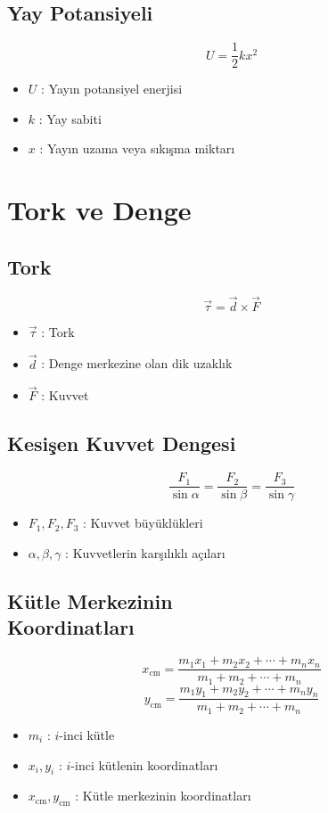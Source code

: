 \documentclass[a4paper, 11pt, titlepage]{article}
\begin{document}
\subsection{Yay Potansiyeli}
\[
U = \frac{1}{2} k x^2
\]
\begin{itemize}
  \item $U$ : Yayın potansiyel enerjisi
  \item $k$ : Yay sabiti
  \item $x$ : Yayın uzama veya sıkışma miktarı
\end{itemize}

\section{Tork ve Denge}



\subsection{Tork}
\[
\vec{\tau} = \vec{d} \times \vec{F}
\]
\begin{itemize}
  \item $\vec{\tau}$ : Tork
  \item $\vec{d}$ : Denge merkezine olan dik uzaklık
  \item $\vec{F}$ : Kuvvet
\end{itemize}

\subsection{Kesişen Kuvvet Dengesi}
\[
\frac{F_1}{\sin \alpha} = \frac{F_2}{\sin \beta} = \frac{F_3}{\sin \gamma}
\]
\begin{itemize}
  \item $F_1, F_2, F_3$ : Kuvvet büyüklükleri
  \item $\alpha, \beta, \gamma$ : Kuvvetlerin karşılıklı açıları
\end{itemize}


\subsection[Kütle Merkezinin Koordinatlar]{Kütle Merkezinin \\Koordinatları}
\[
x_{\mathrm{cm}} = \frac{m_1 x_1 + m_2 x_2 + \cdots + m_n x_n}{m_1 + m_2 + \cdots + m_n}
\]
\[
y_{\mathrm{cm}} = \frac{m_1 y_1 + m_2 y_2 + \cdots + m_n y_n}{m_1 + m_2 + \cdots + m_n}
\]
\begin{itemize}
  \item $m_i$ : $i$-inci kütle
  \item $x_i, y_i$ : $i$-inci kütlenin koordinatları
  \item $x_{\mathrm{cm}}, y_{\mathrm{cm}}$ : Kütle merkezinin koordinatları
\end{itemize}
\end{document}
